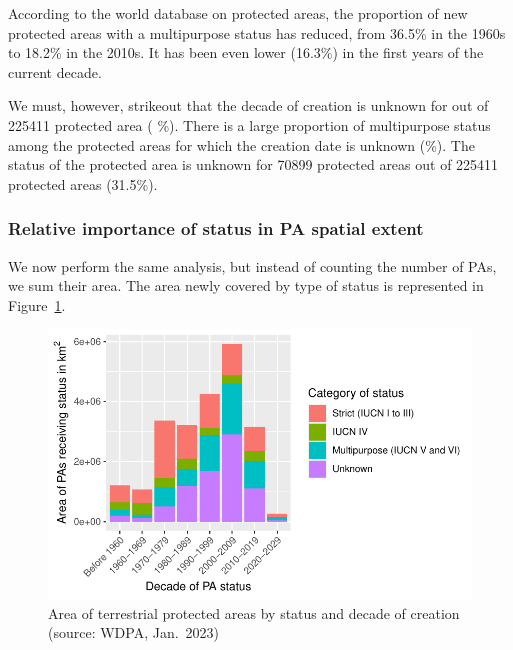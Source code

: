 \documentclass[
  letterpaper,
  DIV=11,
  numbers=noendperiod]{scrartcl}
\begin{document}
According to the world database on protected areas, the proportion of
new protected areas with a multipurpose status has reduced, from 36.5\%
in the 1960s to 18.2\% in the 2010s. It has been even lower (16.3\%) in
the first years of the current decade.

We must, however, strikeout that the decade of creation is unknown for
out of 225411 protected area ( \%). There is a large proportion of
multipurpose status among the protected areas for which the creation
date is unknown (\%). The status of the protected area is unknown for
70899 protected areas out of 225411 protected areas (31.5\%).

\hypertarget{relative-importance-of-status-in-pa-spatial-extent}{%
\subsubsection{Relative importance of status in PA spatial
extent}\label{relative-importance-of-status-in-pa-spatial-extent}}

We now perform the same analysis, but instead of counting the number of
PAs, we sum their area. The area newly covered by type of status is
represented in Figure~\ref{fig-area-pas}.

\begin{figure}

{\centering \includegraphics{Suppl_material_test_EoH_files/figure-pdf/fig-area-pas-1.pdf}

}

\caption{\label{fig-area-pas}Area of terrestrial protected areas by
status and decade of creation (source: WDPA, Jan.~2023)}

\end{figure}
\end{document}
